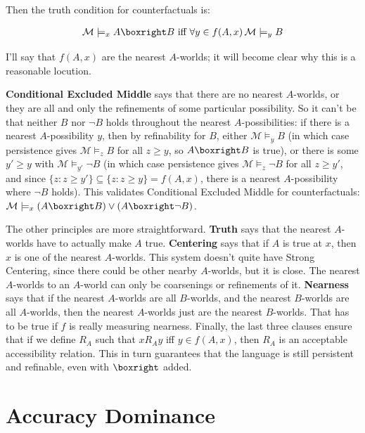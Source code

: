 \documentclass[
  11pt,
  letterpaper,
  DIV=11,
  numbers=noendperiod,
  twoside]{scrartcl}
\begin{document}
Then the truth condition for counterfactuals is:

\begin{align*}
[\boxright] \quad & \mathcal{M} \models_x A \boxright B \text{ iff } \forall y \in f(A, x) \, \mathcal{M} \models_y B 
\end{align*}

I'll say that \(f(A, x)\) are the nearest \(A\)-worlds; it will become
clear why this is a reasonable locution.

\textbf{Conditional Excluded Middle} says that there are no nearest
\(A\)-worlds, or they are all and only the refinements of some
particular possibility. So it can't be that neither \(B\) nor \(\neg B\)
holds throughout the nearest \(A\)-possibilities: if there is a nearest
\(A\)-possibility \(y\), then by refinability for \(B\), either
\(\mathcal{M} \models_y B\) (in which case persistence gives
\(\mathcal{M} \models_z B\) for all \(z \geqslant y\), so
\(A \boxright B\) is true), or there is some \(y' \geqslant y\) with
\(\mathcal{M} \models_{y'} \neg B\) (in which case persistence gives
\(\mathcal{M} \models_z \neg B\) for all \(z \geqslant y'\), and since
\(\{z : z \geqslant y'\} \subseteq \{z : z \geqslant y\} = f(A, x)\),
there is a nearest \(A\)-possibility where \(\neg B\) holds). This
validates Conditional Excluded Middle for counterfactuals:
\(\mathcal{M} \models_x (A \boxright B) \vee (A \boxright \neg B)\).

The other principles are more straightforward. \textbf{Truth} says that
the nearest \(A\)-worlds have to actually make \(A\) true.
\textbf{Centering} says that if \(A\) is true at \(x\), then \(x\) is
one of the nearest \(A\)-worlds. This system doesn't quite have Strong
Centering, since there could be other nearby \(A\)-worlds, but it is
close. The nearest \(A\)-worlds to an \(A\)-world can only be
coarsenings or refinements of it. \textbf{Nearness} says that if the
nearest \(A\)-worlds are all \(B\)-worlds, and the nearest \(B\)-worlds
are all \(A\)-worlds, then the nearest \(A\)-worlds just are the nearest
\(B\)-worlds. That has to be true if \(f\) is really measuring nearness.
Finally, the last three clauses ensure that if we define \(R_A\) such
that \(xR_Ay\) iff \(y \in f(A, x)\), then \(R_A\) is an acceptable
accessibility relation. This in turn guarantees that the language is
still persistent and refinable, even with \(\boxright\) added.

\section{Accuracy Dominance}\label{sec-joyce}
\end{document}
